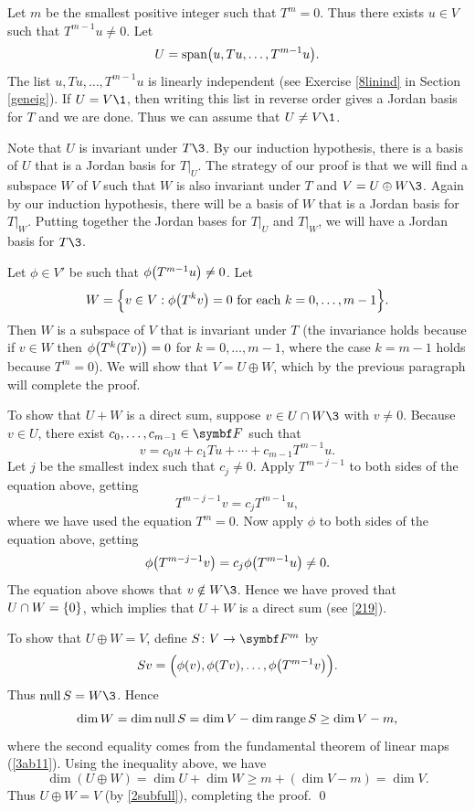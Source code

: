 \pagebreak[3]

Let $m$ be the smallest positive integer such that $T^m = 0$. Thus there exists $u \in V$ such that $T^{m-1}u \ne 0$. Let
\[
U = \Span \paren[\big]{u, Tu, \ldots, T^{m-1}u}.
\]
The list $u, Tu, \ldots, T^{m-1}u$ is linearly independent (see Exercise \ref{8linind} in Section \ref{geneig}). If $U = V\1$, then
writing this list in reverse order gives a Jordan basis for $T$ and we are done. Thus we can assume that $U \ne V\1$.

Note that $U$ is invariant under $T\3$. By our induction hypothesis, there is a basis of $U$ that is a Jordan basis for $T|_U$. The strategy of our proof is that we will find a subspace $W$ of $V$ such that $W$ is also invariant under $T$ and $V = U \oplus W\3$. Again by our induction hypothesis, there will be a basis of $W$ that is a Jordan basis for $T|_W$. Putting together the Jordan bases for $T|_U$ and $T|_W$, we will have a Jordan basis for $T\3$.

Let $\phi \in V'$ be such that $\phi\paren[\big]{ T^{m-1}u } \ne 0$. Let
\[
W = \br[\Big]{ v \in V: \phi\paren[\big]{T^k v} = 0 \text{ for each } k = 0, \ldots, m-1}.
\]
Then $W$ is a subspace of $V$ that is invariant under $T$ \Big(the invariance holds because if $v \in W$ then $\phi\paren[\big]{ T^k(Tv) } = 0$ for $k = 0, \ldots, m-1$, where the case $k = m-1$ holds because $T^m = 0$\Big). We will show that $V = U \oplus W$, which by the previous paragraph will complete the proof.

To show that $U + W$ is a direct sum, suppose $v \in U \cap W\3$ with $v \ne 0$. Because $v \in U$, there exist
$c_0, \ldots, c_{m-1} \in \F{}$ such that
\[
v = c_0 u + c_1 Tu + \cdots + c_{m-1} T^{m-1}u.
\]
Let $j$ be the smallest index such that $c_j \ne 0$. Apply $T^{m-j-1}$ to both sides of the equation above, getting
\[
T^{m-j-1} v = c_j T^{m-1} u,
\]
where we have used the equation $T^m = 0$. Now apply $\phi$ to both sides of the equation above, getting
\[
\phi\paren[\big]{T^{m-j-1} v} = c_j \phi\paren[\big]{T^{m-1} u} \ne 0.
\]
The equation above shows that $v \notin W\3$. Hence we have proved that $U \cap W = \br{0}$, which implies that $U + W$ is a direct sum (see \ref{219}).

To show that $U \oplus W = V$, define $\fun S V {\F m}$ by
\[
Sv = \paren[\Big]{ \phi(v), \phi(Tv), \ldots, \phi\paren[\big]{ T^{m-1}v } }.
\]
Thus $\ker S = W\3$. Hence
\[
\dim W = \dim \ker S = \dim V - \dim \ran S \ge \dim V - m,
\]
where the second equality comes from the fundamental theorem of linear maps (\ref{3ab11}). Using the inequality above, we have
\[
\dim (U \oplus W) = \dim U + \dim W \ge m + (\dim V - m) = \dim V.
\]
Thus $U \oplus W = V$ (by \ref{2subfull}), completing the proof.
\qed

